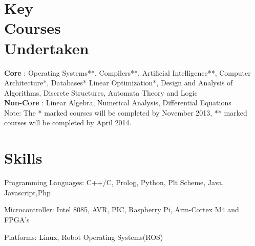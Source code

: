 \documentclass[margin,11pt]{resume}
\begin{document}
\begin{resume}
\section{\mysidestyle Key\\ Courses\\ Undertaken}

\textbf{Core} :
Operating Systems**, Compilers**, Artificial Intelligence**, 
Computer Architecture*, Databases*
Linear Optimization*, 
Design and Analysis of Algorithms, 
Discrete Structures, 
Automata Theory and Logic\\       
\textbf{Non-Core} : Linear Algebra, Numerical Analysis, Differential Equations\\
Note: The * marked courses will be completed by November 2013, ** marked courses will be completed by April 2014.
\vspace{-3mm}
\section{\mysidestyle Skills}
\begin{list2}
\item Programming Languages: C++/C, Prolog, Python, Plt Scheme, Java, Javascript,Php
\item Microcontroller: Intel 8085, AVR, PIC, Raspberry Pi, Arm-Cortex M4 and  FPGA's
\item Platforms: Linux, Robot Operating Systems(ROS)
\end{list2}	
\end{resume}
\end{document}
